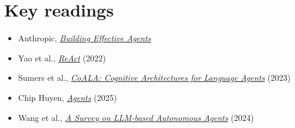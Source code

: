 \documentclass[10pt,oneside]{report}
\begin{document}
\section{Key readings}
\begin{itemize}
\item Anthropic, \href{https://www.anthropic.com/engineering/building-effective-agents}{\emph{Building Effective Agents}}
\item Yao et al., \href{https://arxiv.org/abs/2210.03629}{\emph{ReAct}} (2022)
\item Sumers et al., \href{https://arxiv.org/abs/2309.02427}{\emph{CoALA: Cognitive Architectures for Language Agents}} (2023)
\item Chip Huyen, \href{https://huyenchip.com/2025/01/07/agents.html}{\emph{Agents}} (2025)
\item Wang et al., \href{https://arxiv.org/abs/2308.11432}{\emph{A Survey on LLM-based Autonomous Agents}} (2024)
\end{itemize}
\end{document}
